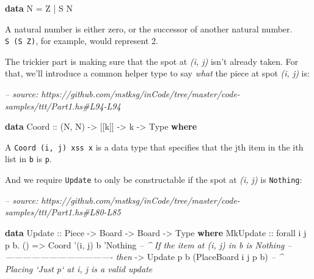 \documentclass[]{article}
\newenvironment{Shaded}{}{}
\newcommand{\CommentTok}[1]{\textcolor[rgb]{0.38,0.63,0.69}{\textit{#1}}}
\newcommand{\DataTypeTok}[1]{\textcolor[rgb]{0.56,0.13,0.00}{#1}}
\newcommand{\FunctionTok}[1]{\textcolor[rgb]{0.02,0.16,0.49}{#1}}
\newcommand{\KeywordTok}[1]{\textcolor[rgb]{0.00,0.44,0.13}{\textbf{#1}}}
\newcommand{\NormalTok}[1]{#1}
\newcommand{\OtherTok}[1]{\textcolor[rgb]{0.00,0.44,0.13}{#1}}
\begin{document}
\begin{Shaded}
\begin{Highlighting}[]
\KeywordTok{data} \DataTypeTok{N} \FunctionTok{=} \DataTypeTok{Z} \FunctionTok{|} \DataTypeTok{S} \DataTypeTok{N}
\end{Highlighting}
\end{Shaded}

A natural number is either zero, or the successor of another natural number.
\texttt{S\ (S\ Z)}, for example, would represent 2.

The trickier part is making sure that the spot at \emph{(i, j)} isn't already
taken. For that, we'll introduce a common helper type to say \emph{what} the
piece at spot \emph{(i, j)} is:

\begin{Shaded}
\begin{Highlighting}[]
\CommentTok{-- source: https://github.com/mstksg/inCode/tree/master/code-samples/ttt/Part1.hs#L94-L94}

\KeywordTok{data} \DataTypeTok{Coord}\OtherTok{ ::}\NormalTok{ (}\DataTypeTok{N}\NormalTok{, }\DataTypeTok{N}\NormalTok{) }\OtherTok{->}\NormalTok{ [[k]] }\OtherTok{->}\NormalTok{ k }\OtherTok{->} \DataTypeTok{Type} \KeywordTok{where}
\end{Highlighting}
\end{Shaded}

A \texttt{Coord\ \textquotesingle{}(i,\ j)\ xss\ x} is a data type that
specifies that the jth item in the ith list in \texttt{b} is \texttt{p}.

And we require \texttt{Update} to only be constructable if the spot at \emph{(i,
j)} is \texttt{Nothing}:

\begin{Shaded}
\begin{Highlighting}[]
\CommentTok{-- source: https://github.com/mstksg/inCode/tree/master/code-samples/ttt/Part1.hs#L80-L85}

\KeywordTok{data} \DataTypeTok{Update}\OtherTok{ ::} \DataTypeTok{Piece} \OtherTok{->} \DataTypeTok{Board} \OtherTok{->} \DataTypeTok{Board} \OtherTok{->} \DataTypeTok{Type} \KeywordTok{where}
    \DataTypeTok{MkUpdate}
\OtherTok{        ::}\NormalTok{ forall i j p b}\FunctionTok{.}\NormalTok{ ()}
        \OtherTok{=>} \DataTypeTok{Coord}\NormalTok{ '(i, j) b '}\DataTypeTok{Nothing}         \CommentTok{-- ^ If the item at (i, j) in b is Nothing}
        \CommentTok{-- ------------------------------------- then}
        \OtherTok{->} \DataTypeTok{Update}\NormalTok{ p b (}\DataTypeTok{PlaceBoard}\NormalTok{ i j p b)  }\CommentTok{-- ^ Placing `Just p` at i, j is a valid update}
\end{Highlighting}
\end{Shaded}
\end{document}
